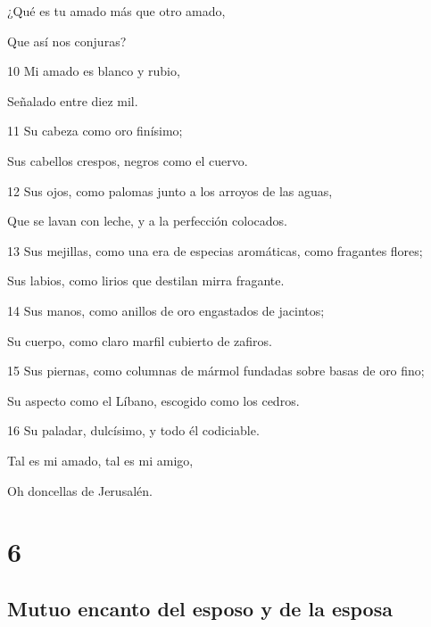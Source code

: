 \par ¿Qué es tu amado más que otro amado,
\par Que así nos conjuras?
\par 10 Mi amado es blanco y rubio,
\par Señalado entre diez mil.
\par 11 Su cabeza como oro finísimo;
\par Sus cabellos crespos, negros como el cuervo.
\par 12 Sus ojos, como palomas junto a los arroyos de las aguas,
\par Que se lavan con leche, y a la perfección colocados.
\par 13 Sus mejillas, como una era de especias aromáticas, como fragantes flores;
\par Sus labios, como lirios que destilan mirra fragante.
\par 14 Sus manos, como anillos de oro engastados de jacintos;
\par Su cuerpo, como claro marfil cubierto de zafiros.
\par 15 Sus piernas, como columnas de mármol fundadas sobre basas de oro fino;
\par Su aspecto como el Líbano, escogido como los cedros.
\par 16 Su paladar, dulcísimo, y todo él codiciable.
\par Tal es mi amado, tal es mi amigo,
\par Oh doncellas de Jerusalén.

\chapter{6}

\section*{Mutuo encanto del esposo y de la esposa}

